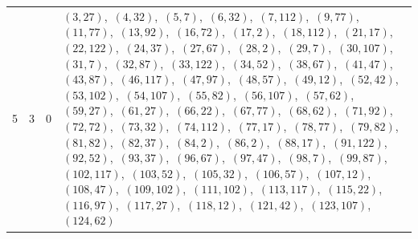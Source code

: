 \documentclass[11pt]{article}
\begin{document}
\begin{longtable}{@{}rrl>{\raggedright\arraybackslash}p{}@{}}
5 & 3 & $0$ & $(3,27)$,\allowbreak\ $(4,32)$,\allowbreak\ $(5,7)$,\allowbreak\ $(6,32)$,\allowbreak\ $(7,112)$,\allowbreak\ $(9,77)$,\allowbreak\ $(11,77)$,\allowbreak\ $(13,92)$,\allowbreak\ $(16,72)$,\allowbreak\ $(17,2)$,\allowbreak\ $(18,112)$,\allowbreak\ $(21,17)$,\allowbreak\ $(22,122)$,\allowbreak\ $(24,37)$,\allowbreak\ $(27,67)$,\allowbreak\ $(28,2)$,\allowbreak\ $(29,7)$,\allowbreak\ $(30,107)$,\allowbreak\ $(31,7)$,\allowbreak\ $(32,87)$,\allowbreak\ $(33,122)$,\allowbreak\ $(34,52)$,\allowbreak\ $(38,67)$,\allowbreak\ $(41,47)$,\allowbreak\ $(43,87)$,\allowbreak\ $(46,117)$,\allowbreak\ $(47,97)$,\allowbreak\ $(48,57)$,\allowbreak\ $(49,12)$,\allowbreak\ $(52,42)$,\allowbreak\ $(53,102)$,\allowbreak\ $(54,107)$,\allowbreak\ $(55,82)$,\allowbreak\ $(56,107)$,\allowbreak\ $(57,62)$,\allowbreak\ $(59,27)$,\allowbreak\ $(61,27)$,\allowbreak\ $(66,22)$,\allowbreak\ $(67,77)$,\allowbreak\ $(68,62)$,\allowbreak\ $(71,92)$,\allowbreak\ $(72,72)$,\allowbreak\ $(73,32)$,\allowbreak\ $(74,112)$,\allowbreak\ $(77,17)$,\allowbreak\ $(78,77)$,\allowbreak\ $(79,82)$,\allowbreak\ $(81,82)$,\allowbreak\ $(82,37)$,\allowbreak\ $(84,2)$,\allowbreak\ $(86,2)$,\allowbreak\ $(88,17)$,\allowbreak\ $(91,122)$,\allowbreak\ $(92,52)$,\allowbreak\ $(93,37)$,\allowbreak\ $(96,67)$,\allowbreak\ $(97,47)$,\allowbreak\ $(98,7)$,\allowbreak\ $(99,87)$,\allowbreak\ $(102,117)$,\allowbreak\ $(103,52)$,\allowbreak\ $(105,32)$,\allowbreak\ $(106,57)$,\allowbreak\ $(107,12)$,\allowbreak\ $(108,47)$,\allowbreak\ $(109,102)$,\allowbreak\ $(111,102)$,\allowbreak\ $(113,117)$,\allowbreak\ $(115,22)$,\allowbreak\ $(116,97)$,\allowbreak\ $(117,27)$,\allowbreak\ $(118,12)$,\allowbreak\ $(121,42)$,\allowbreak\ $(123,107)$,\allowbreak\ $(124,62)$\\

\end{longtable}
\end{document}
